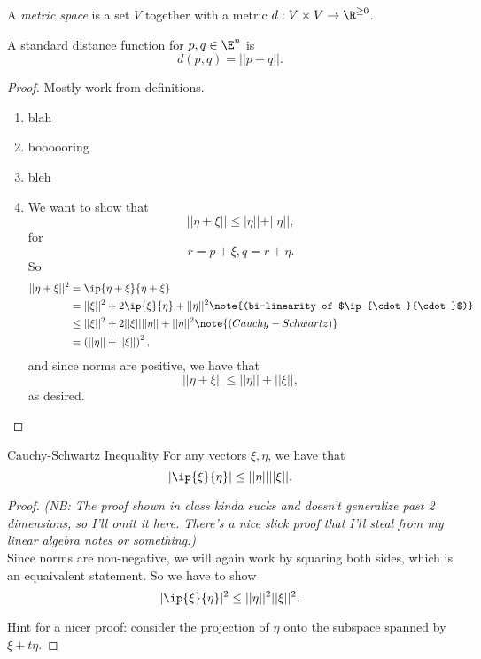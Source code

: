 \documentclass{notes}
\begin{document}
\begin{defn}
  A \emph{metric space} is a set $V$ together with a metric $d: V \times V \to \R^{\geq 0}$.
\end{defn}

\begin{proposition}
  A standard distance function for $p,q\in \E^n$ is $$d(p,q) = || p - q ||.$$
\end{proposition}
\begin{proof}
  Mostly work from definitions.
  \begin{enumerate}
      \item blah
      \item boooooring
      \item bleh
      \item We want to show that $$||\eta + \xi|| \leq |\eta|| + ||\eta||,$$ for $$r = p + \xi, q = 
        r + \eta.$$ So
        \begin{align*}
          ||\eta + \xi||^2 &= \ip{\eta + \xi}{\eta + \xi} \\
                           &= ||\xi||^2 + 2\ip{\xi}{\eta} + ||\eta||^2 \note{(bi-linearity of
                                $\ip{\cdot}{\cdot}$)} \\
                           &\leq ||\xi||^2 + 2||\xi||||\eta|| + ||\eta||^2 \note{(Cauchy-Schwartz)} \\
                           &= \left(||\eta|| + ||\xi||\right)^2,
        \end{align*}
        and since norms are positive, we have that $$||\eta + \xi|| \leq ||\eta|| + ||\xi||,$$ as
        desired.
  \end{enumerate}
\end{proof}

\begin{theorem}{Cauchy-Schwartz Inequality}
  For any vectors $\xi, \eta$, we have that $$|\ip{\xi}{\eta}| \leq ||\eta|| ||\xi||.$$
\end{theorem}
\begin{proof}
  \emph{(NB: The proof shown in class kinda sucks and doesn't generalize past 2 dimensions, so I'll
  omit it here. There's a nice slick proof that I'll steal from my linear algebra notes or
  something.)} \\

  Since norms are non-negative, we will again work by squaring both sides, which is an equaivalent
  statement. So we have to show $$|\ip{\xi}{\eta}|^2 \leq ||\eta||^2 ||\xi||^2.$$

  Hint for a nicer proof: consider the projection of $\eta$ onto the subspace spanned by $\xi +
  t\eta$.
\end{proof}
\end{document}
